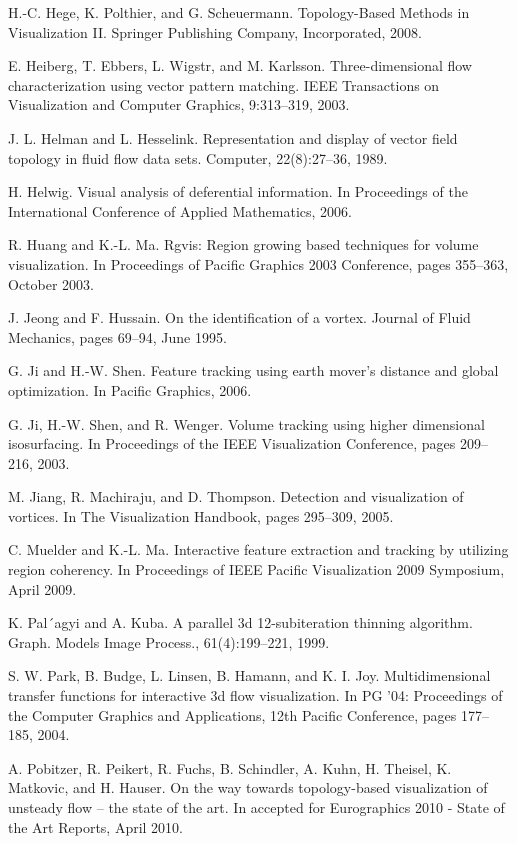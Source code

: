 \documentclass[10pt, conference, compsocconf]{IEEEtran}
\begin{document}
\begin{thebibliography}{1}
\bibitem{}
H.-C. Hege, K. Polthier, and G. Scheuermann. Topology-Based Methods in Visualization II. Springer Publishing Company, Incorporated, 2008.

\bibitem{}
E. Heiberg, T. Ebbers, L. Wigstr, and M. Karlsson. Three-dimensional flow characterization using vector pattern matching. IEEE Transactions on Visualization and Computer Graphics, 9:313–319, 2003.

\bibitem{}
J. L. Helman and L. Hesselink. Representation and display of vector field topology in fluid flow data sets. Computer, 22(8):27–36, 1989.

\bibitem{}
H. Helwig. Visual analysis of deferential information. In Proceedings of the International Conference of Applied Mathematics, 2006.

\bibitem{}
R. Huang and K.-L. Ma. Rgvis: Region growing based techniques for volume visualization. In Proceedings of Pacific Graphics 2003 Conference, pages 355–363, October 2003.

\bibitem{}
J. Jeong and F. Hussain. On the identification of a vortex. Journal of Fluid Mechanics, pages 69–94, June 1995.

\bibitem{}
G. Ji and H.-W. Shen. Feature tracking using earth mover’s distance and global optimization. In Pacific Graphics, 2006.

\bibitem{}
G. Ji, H.-W. Shen, and R. Wenger. Volume tracking using higher dimensional isosurfacing. In Proceedings of the IEEE Visualization Conference, pages 209–216, 2003.

\bibitem{}
M. Jiang, R. Machiraju, and D. Thompson. Detection and visualization of vortices. In The Visualization Handbook, pages 295–309, 2005.

\bibitem{}
C. Muelder and K.-L. Ma. Interactive feature extraction and tracking by utilizing region coherency. In Proceedings of IEEE Pacific Visualization 2009 Symposium, April 2009.

\bibitem{}
K. Pal´agyi and A. Kuba. A parallel 3d 12-subiteration thinning algorithm. Graph. Models Image Process., 61(4):199–221, 1999.

\bibitem{}
S. W. Park, B. Budge, L. Linsen, B. Hamann, and K. I. Joy. Multidimensional transfer functions for interactive 3d flow visualization. In PG ’04: Proceedings of the Computer Graphics and Applications, 12th Pacific Conference, pages 177–185, 2004.

\bibitem{}
A. Pobitzer, R. Peikert, R. Fuchs, B. Schindler, A. Kuhn, H. Theisel, K. Matkovic, and H. Hauser. On the way towards topology-based visualization of unsteady flow – the state of the art. In accepted for Eurographics 2010 - State of the Art Reports, April 2010.


\end{thebibliography}
\end{document}
